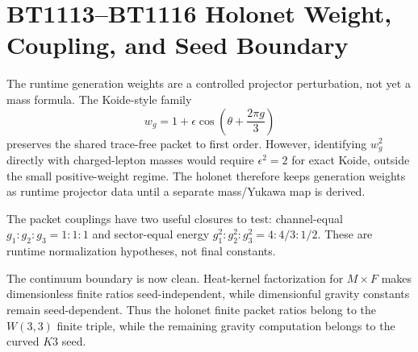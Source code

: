 \section{BT1113--BT1116 Holonet Weight, Coupling, and Seed Boundary}
\label{sec:bt1113-bt1116-holonet-weight-coupling-factorization}

The runtime generation weights are a controlled projector perturbation, not yet a mass formula.  The Koide-style family
\[
w_g=1+\epsilon\cos\left(\theta+\frac{2\pi g}{3}\right)
\]
preserves the shared trace-free packet to first order.  However, identifying $w_g^2$ directly with charged-lepton masses would require $\epsilon^2=2$ for exact Koide, outside the small positive-weight regime.  The holonet therefore keeps generation weights as runtime projector data until a separate mass/Yukawa map is derived.

The packet couplings have two useful closures to test: channel-equal $g_1:g_2:g_3=1:1:1$ and sector-equal energy $g_1^2:g_2^2:g_3^2=4:4/3:1/2$.  These are runtime normalization hypotheses, not final constants.

The continuum boundary is now clean.  Heat-kernel factorization for $M\times F$ makes dimensionless finite ratios seed-independent, while dimensionful gravity constants remain seed-dependent.  Thus the holonet finite packet ratios belong to the $W(3,3)$ finite triple, while the remaining gravity computation belongs to the curved $K3$ seed.
